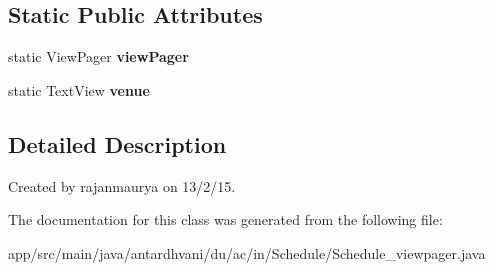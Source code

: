 \subsection*{Static Public Attributes}
\begin{DoxyCompactItemize}
\item 
\hypertarget{classantardhvani_1_1du_1_1ac_1_1in_1_1_schedule_1_1_schedule__viewpager_a68fb62ca588683d4714e2b8bbb3f6c2c}{}static View\+Pager {\bfseries view\+Pager}\label{classantardhvani_1_1du_1_1ac_1_1in_1_1_schedule_1_1_schedule__viewpager_a68fb62ca588683d4714e2b8bbb3f6c2c}

\item 
\hypertarget{classantardhvani_1_1du_1_1ac_1_1in_1_1_schedule_1_1_schedule__viewpager_a5f14060cc587000ba353f543246f02a2}{}static Text\+View {\bfseries venue}\label{classantardhvani_1_1du_1_1ac_1_1in_1_1_schedule_1_1_schedule__viewpager_a5f14060cc587000ba353f543246f02a2}

\end{DoxyCompactItemize}


\subsection{Detailed Description}
Created by rajanmaurya on 13/2/15. 

The documentation for this class was generated from the following file\+:\begin{DoxyCompactItemize}
\item 
app/src/main/java/antardhvani/du/ac/in/\+Schedule/Schedule\+\_\+viewpager.\+java\end{DoxyCompactItemize}
